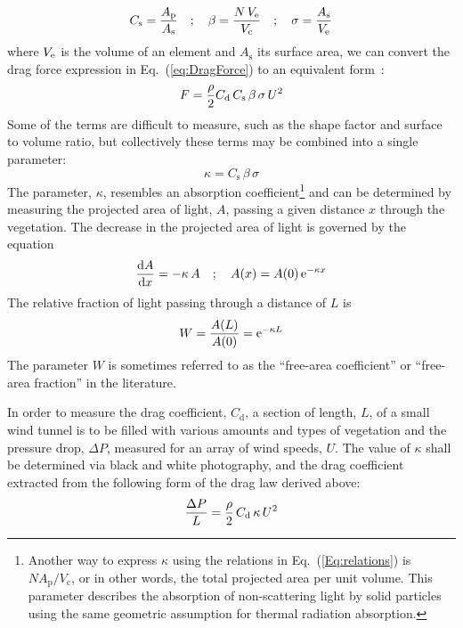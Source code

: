 \documentclass[12pt]{article}
\begin{document}
\begin{equation}
   C_{\rm s} = \frac{A_{\mathrm{p}}}{A_{\mathrm{s}}} \quad ; \quad  \beta=\frac{N \, V_{\rm e}}{V_{\mathrm{c}}}  \quad ; \quad \sigma=\frac{A_{\rm s}}{V_{\rm e}} \label{Eq:relations}
\end{equation}
where $V_{\rm e}$ is the volume of an element and $A_{\mathrm{s}}$ its surface area, we can convert the drag force expression in Eq.~(\ref{eq:DragForce}) to an equivalent form~\cite{Mueller2014}:
\begin{equation}
\label{eq:DragForcea}
F  = \frac{\rho}{2} C_{\rm d} \, C_{\mathrm{s}} \, \beta \, \sigma \, U^2
\end{equation}
Some of the terms are difficult to measure, such as the shape factor and surface to volume ratio, but collectively these terms may be combined into a single parameter:
\begin{equation}
\label{eq:Kappa}
\kappa = C_{\mathrm{s}} \, \beta \, \sigma
\end{equation}
The parameter, $\kappa$, resembles an absorption coefficient\footnote{Another way to express $\kappa$ using the relations in Eq.~(\ref{Eq:relations}) is $N A_{\mathrm{p}}/V_{\mathrm{c}}$, or in other words, the total projected area per unit volume. This parameter describes the absorption of non-scattering light by solid particles using the same geometric assumption for thermal radiation absorption.} and can be determined by measuring the projected area of light, $A$, passing a given distance $x$ through the vegetation. The decrease in the projected area of light is governed by the equation
\begin{equation}
   \frac{ \mathrm{d}A}{\mathrm{d} x} = -\kappa \, A  \quad ; \quad  A(x) = A(0) \, {\rm e}^{-\kappa x}
\end{equation}
The relative fraction of light passing through a distance of $L$ is
\begin{equation}\label{eq:WhiteFraction}
W = \frac{A(L)}{A(0)}={\rm e}^{-\kappa L}
\end{equation}
The parameter $W$ is sometimes referred to as the ``free-area coefficient'' or ``free-area fraction'' in the literature.

In order to measure the drag coefficient, $C_{\mathrm{d}}$, a section of length, $L$, of a small wind tunnel is to be filled with various amounts and types of vegetation and the pressure drop, $\Delta P$, measured for an array of wind speeds, $U$. The value of $\kappa$ shall be determined via black and white photography, and the drag coefficient extracted from the following form of the drag law derived above:
\begin{equation}\label{eq:Pressure}
\frac{\Delta P}{L}  = \frac{\rho}{2} \, C_{\rm d} \, \kappa \, U^2
\end{equation}
\pagebreak
\end{document}
